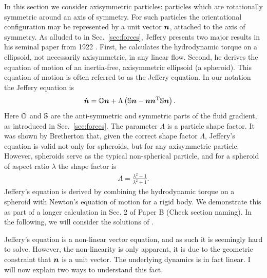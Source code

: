 \documentclass[thesis.tex]{subfiles}
\begin{document}
In this section we consider axisymmetric particles: particles which are rotationally symmetric around an axis of symmetry. For such particles the orientational configuration may be represented by a unit vector $\mbox{\boldmath$n$}$, attached to the axis of symmetry. As alluded to in Sec.~\ref{sec:forces}, Jeffery presents two major results in his seminal paper from 1922 \cite{jeffery1922}. First, he calculates the hydrodynamic torque on a ellipsoid, not necessarily axisymmetric, in any linear flow. Second, he derives the equation of motion of an inertia-free, axisymmetric ellipsoid (a spheroid). This equation of motion is often referred to as the Jeffery equation. In our notation the Jeffery equation is
\begin{align}
	\dot{\ve n} &= \ma O \ve n + \Lambda \left(\ma S \ve n - \ve n \ve n \transpose \ma S \ve n\right).\eqnlab{jeffery}
\end{align}
Here $\mathbb{O}$ and $\mathbb{S}$ are the anti-symmetric and symmetric parts of the fluid gradient, as introduced in Sec.~\ref{sec:forces}. The parameter $\Lambda$ is a particle shape factor. It was shown by Bretherton \cite{bretherton1962} that, given the correct shape factor $\Lambda$, Jeffery's equation is valid not only for spheroids, but for any axisymmetric particle. However, spheroids serve as the typical non-spherical particle, and for a spheroid of aspect ratio $\lambda$ the shape factor is
\begin{align*}
	\Lambda = \frac{\lambda^2-1}{\lambda^2+1}.
\end{align*}
Jeffery's equation is derived by combining the hydrodynamic torque on a spheroid with Newton's equation of motion for a rigid body. We demonstrate this as part of a longer calculation in {\color{red}Sec. 2 of Paper B (Check section naming)}. In the following, we will consider the solutions of .

Jeffery's equation is a non-linear vector equation, and as such it is seemingly hard to solve. However, the non-linearity is only apparent, it is due to the geometric constraint that $\mbox{\boldmath$n$}$ is a unit vector. The underlying dynamics is in fact linear. I will now explain two ways to understand this fact.
\end{document}
